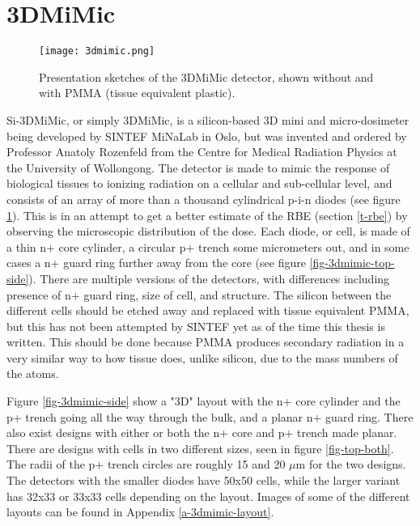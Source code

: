 \documentclass[../main/thesis.tex]{subfiles}
\begin{document}
\section{3DMiMic}
\label{3d-3d}

\begin{figure}%
	\centering
	\texttt{[image: 3dmimic.png]}
	\caption{Presentation sketches of the 3DMiMic detector, shown without and with PMMA (tissue equivalent plastic). \citep{Trento2015}}
	\label{fig-3dmimic}
\end{figure}

Si-3DMiMic, or simply 3DMiMic, is a silicon-based 3D mini and micro-dosimeter being developed by SINTEF MiNaLab in Oslo, but was invented and ordered by Professor Anatoly Rozenfeld from the Centre for Medical Radiation Physics at the University of Wollongong. The detector is made to mimic the response of biological tissues to ionizing radiation on a cellular and sub-cellular level, and consists of an array of more than a thousand cylindrical p-i-n diodes (see figure \ref{fig-3dmimic}). This is in an attempt to get a better estimate of the \acrfull{RBE} (section \ref{t-rbe}) by observing the microscopic distribution of the dose. Each diode, or cell, is made of a thin n+ core cylinder, a circular p+ trench some micrometers out, and in some cases a n+ guard ring further away from the core (see figure \ref{fig-3dmimic-top-side}). There are multiple versions of the detectors, with differences including presence of n+ guard ring, size of cell, and structure. The silicon between the different cells should be etched away and replaced with tissue equivalent \gls{PMMA}, but this has not been attempted by SINTEF yet as of the time this thesis is written. This should be done because \gls{PMMA} produces secondary radiation in a very similar way to how tissue does, unlike silicon, due to the mass numbers of the atoms. 


Figure \ref{fig-3dmimic-side} show a "3D" layout with the n+ core cylinder and the p+ trench going all the way through the bulk, and a planar n+ guard ring. There also exist designs with either or both the n+ core and p+ trench made planar. There are designs with cells in two different sizes, seen in figure \ref{fig-top-both}. The radii of the p+ trench circles are roughly 15 and 20 $\mu$m for the two designs. The detectors with the smaller diodes have 50x50 cells, while the larger variant has 32x33 or 33x33 cells depending on the layout. Images of some of the different layouts can be found in Appendix \ref{a-3dmimic-layout}.
\end{document}
